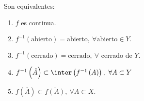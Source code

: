 \begin{prop}
Son equivalentes:
\begin{enumerate}
    \item $f$ es continua.
    \item $f^{-1}\left( \text{abierto}  \right) = \text{abierto} ,\ \forall \text{abierto} \in Y$.
    \item $f^{-1}\left( \text{cerrado} \right) = \text{cerrado},\ \forall $ cerrado de $Y$.
    \item $f^{-1}\left( \mathring{A} \right) \subset \inter\left( f^{-1}\left( A \right) \right),\ \forall A \subset Y$
    \item $f\left( \overline{A} \right) \subset \overline{f\left( A \right)},\ \forall A \subset X$. 
\end{enumerate}
\end{prop}
